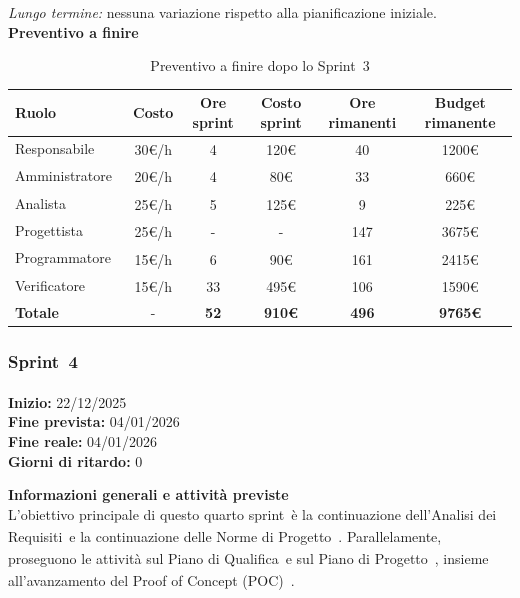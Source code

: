 \documentclass[a4paper,12pt]{article}
\newcommand{\pediceG}{\texorpdfstring{\textsubscript{\scalebox{0.6}{\textbf{G}}}~}{G}}
\begin{document}
\textit{Lungo termine:} nessuna variazione rispetto alla pianificazione iniziale.\\

\noindent\textbf{Preventivo a finire}

\begin{table}[H]
\centering
\footnotesize
\begin{tabular}{|l|c|c|c|c|c|}
\hline
Ruolo & Costo & Ore sprint & Costo sprint & Ore rimanenti & Budget rimanente \\
\hline
Responsabile\pediceG & 30€/h & 4 & 120€ & 40 & 1200€ \\
\hline
Amministratore\pediceG & 20€/h & 4 & 80€ & 33 & 660€ \\
\hline
Analista\pediceG & 25€/h & 5 & 125€ & 9 & 225€ \\
\hline
Progettista\pediceG & 25€/h & - & - & 147 & 3675€ \\
\hline
Programmatore\pediceG & 15€/h & 6 & 90€ & 161 & 2415€ \\
\hline
Verificatore\pediceG & 15€/h & 33 & 495€ & 106 & 1590€ \\
\hline
\textbf{Totale} & - & \textbf{52} & \textbf{910€} & \textbf{496} & \textbf{9765€} \\
\hline
\end{tabular}
\caption{Preventivo a finire dopo lo Sprint\pediceG 3}
\label{tab:risorse-sprint3}
\end{table}

\newpage

\subsubsection{Sprint\pediceG 4}

\textbf{Inizio:} 22/12/2025 \\
\textbf{Fine prevista:} 04/01/2026\\
\textbf{Fine reale:} 04/01/2026\\
\textbf{Giorni di ritardo:} 0

\noindent\textbf{Informazioni generali e attività previste}\\
L'obiettivo principale di questo quarto sprint\pediceG è la continuazione dell'Analisi dei Requisiti\pediceG e la continuazione delle Norme di Progetto\pediceG. Parallelamente, proseguono le attività sul Piano di Qualifica\pediceG e sul Piano di Progetto\pediceG, insieme all'avanzamento del Proof of Concept (POC)\pediceG.
\end{document}
